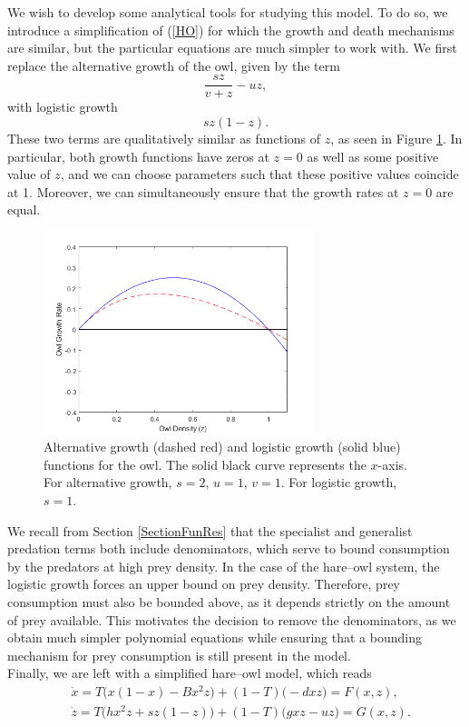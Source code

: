 \documentclass[12pt]{UOthesis}
\theoremstyle{remarkstyle}
\begin{document}
We wish to develop some analytical tools for studying this model. To do so, we introduce a simplification of (\ref{HO}) for which the growth and death mechanisms are similar, but the particular equations are much simpler to work with. We first replace the alternative growth of the owl, given by the term
$$\frac{sz}{v+z}-uz,$$
with logistic growth
$$sz(1-z).$$
These two terms are qualitatively similar as functions of $z$, as seen in Figure \ref{OwlLogVsAlt}. In particular, both growth functions have zeros at $z=0$ as well as some positive value of $z$, and we can choose parameters such that these positive values coincide at 1. Moreover, we can simultaneously ensure that the growth rates at $z=0$ are equal.
\begin{figure}[h!]
	\centering
	\includegraphics[width=0.7\textwidth]{OwlAltVsLogGrowth.png}
	\caption[Alternative growth and logistic growth for the owl]{Alternative growth (dashed red) and logistic growth (solid blue) functions for the owl. The solid black curve represents the $x$-axis. For alternative growth, $s=2$, $u=1$, $v=1$. For logistic growth, $s=1$.\label{OwlLogVsAlt}}
\end{figure}

We recall from Section \ref{SectionFunRes} that the specialist and generalist predation terms both include denominators, which serve to bound consumption by the predators at high prey density. In the case of the hare--owl system, the logistic growth forces an upper bound on prey density. Therefore, prey consumption must also be bounded above, as it depends strictly on the amount of prey available. This motivates the decision to remove the denominators, as we obtain much simpler polynomial equations while ensuring that a bounding mechanism for prey consumption is still present in the model.\\

Finally, we are left with a simplified hare--owl model, which reads
\begin{equation}
	\begin{split}
		&\dot{x}=T\Big(x(1-x)-Bx^2z\Big)+(1-T)\Big(-dxz\Big)=F(x,z),\\
		&\dot{z}=T\Big(hx^2z+sz(1-z)\Big)+(1-T)\Big(gxz-uz\Big)=G(x,z).
	\end{split}
	\label{HOsimp}
\end{equation}
\end{document}
